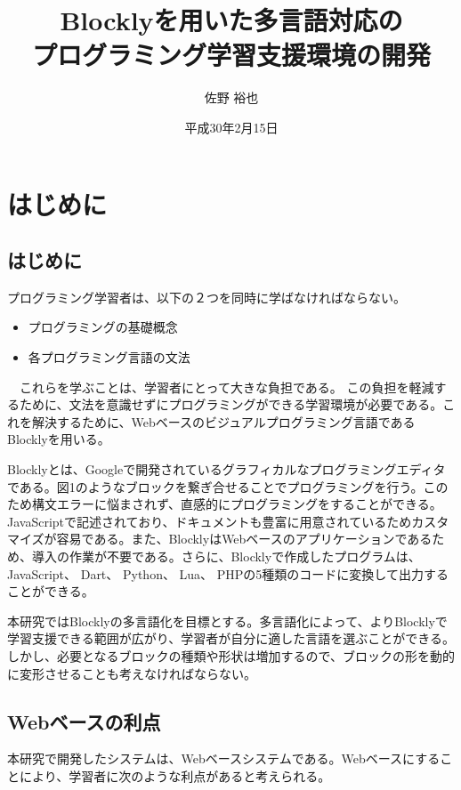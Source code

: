 \documentclass{eniepaper}
\title {Blocklyを用いた多言語対応の\\プログラミング学習支援環境の開発}
\author{佐野 裕也}
\date{平成30年2月15日}
\begin{document}
 
\maketitle
                                                          
   \chapter{はじめに}
   
   \section{はじめに}


  プログラミング学習者は、以下の２つを同時に学ばなければならない。
  
\begin{itemize}
\item プログラミングの基礎概念
\item 各プログラミング言語の文法
\end{itemize} 

　これらを学ぶことは、学習者にとって大きな負担である。
 この負担を軽減するために、文法を意識せずにプログラミングができる学習環境が必要である。これを解決するために、Webベースのビジュアルプログラミング言語であるBlockly\cite{Blockly}を用いる。
  
Blocklyとは、Googleで開発されているグラフィカルなプログラミングエディタである。図1のようなブロックを繋ぎ合せることでプログラミングを行う。このため構文エラーに悩まされず、直感的にプログラミングをすることができる。JavaScriptで記述されており、ドキュメントも豊富に用意されているためカスタマイズが容易である。また、BlocklyはWebベースのアプリケーションであるため、導入の作業が不要である。さらに、Blocklyで作成したプログラムは、JavaScript、 Dart、 Python、 Lua、 PHPの5種類のコードに変換して出力することができる。
  
本研究ではBlocklyの多言語化を目標とする。多言語化によって、よりBlocklyで学習支援できる範囲が広がり、学習者が自分に適した言語を選ぶことができる。しかし、必要となるブロックの種類や形状は増加するので、ブロックの形を動的に変形させることも考えなければならない。 


   \section{Webベースの利点}
   
本研究で開発したシステムは、Webベースシステムである。Webベースにすることにより、学習者に次のような利点があると考えられる。
\end{document}

